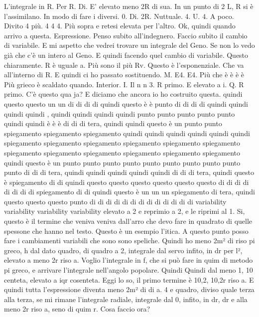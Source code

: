 \begin{soluzione}
{   L'integrale in R. Per R. Di. E' elevato meno 2R di sua. In un punto di 2 L, R si è l'assimilano. In modo di fare i diversi. 0. Di. 2R. Nuttuale. 4. U. 4. A poco. Divito 4 più. 4 4 4. Più sopra e retesi elevata per l'altro. Ok, quindi quando arrivo a questa. Espressione. Penso subito all'indegnero. Faccio subito il cambio di variabile. E mi aspetto che vedrei trovare un integrale del Geno. Se non lo vedo già che c'è un intero al Geno. E quindi facendo quel cambio di variabile. Questo chiaramente. R è uguale a. Più sono il più Rv. Questo è l'esponenziale. Che va all'interno di R. E quindi ci ho passato sostituendo. M. E4. E4. Più che è è è è Più grieco è scaldato quando. Interior. I. Il n n 3. R primo. E elevato a i. Q. R primo. C'è questo qua ja? E diciamo che ancora io ho costruito questa. quindi questo questo un un di di di di quindi questo è è punto di di di di quindi quindi quindi quindi , quindi quindi quindi quindi punto punto punto punto punto quindi quindi è è è di di di tera, quindi quindi  questo è un punto punto spiegamento spiegamento spiegamento quindi quindi quindi quindi quindi quindi spiegamento spiegamento spiegamento spiegamento spiegamento spiegamento spiegamento spiegamento spiegamento spiegamento spiegamento spiegamento quindi questo è un punto punto punto punto punto punto punto punto punto punto di di di tera, quindi quindi quindi quindi quindi di di di tera, quindi questo è  spiegamento di di quindi questo questo questo questo questo questo di di di di di di di di spiegamento di di quindi questo è un un un spiegamento di tera, quindi questo questo questo punto di di di di di di di di di di di di di variability variability variability variability elevato a 2 e reprimio a 2, e le riprimi al 1. Si, questo è il termine che veniva veniva dall'arro che devo fare in quadrato di quelle spessone che hanno nel testo. Questo è un esempio l'itica. A questo punto posso fare i cambiamenti variabili che sono sono speliche. Quindi ho meno 2m² di riso pi greco, h dal dato quadro, di quadro a 2, integrale dal servo infito, in dr per l², elevato a meno 2r riso a. Voglio l'integrale in f, che si può fare in quim di metodo pi greco, e arrivare l'integrale nell'angolo popolare. Quindi Quindi dal meno 1, 10 centeta, elevato a iqr cosenteta. Eggi lo so, il primo termine è 10,2, 10,2r riso a. E quindi tutta l'espressione diventa meno 2m² di di a. 4 e quadro, diviso quale terza alla terza, se mi rimane l'integrale radiale, integrale dal 0, infito, in dr, dr e alla meno 2r riso a, seno di quim r. Cosa faccio ora? 
   
}
\end{soluzione}
